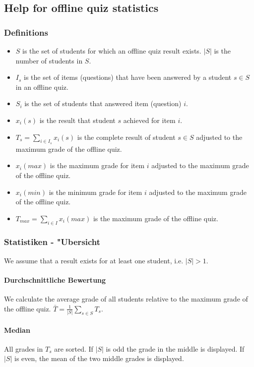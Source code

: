 \documentclass[12pt]{report}
\begin{document}
\subsection{Help for offline quiz statistics}
\subsubsection{Definitions}
\begin{itemize}
\item $S$ is the set of students for which an offline quiz result exists. $|S|$ is the number of students in $S$.
\item $I_s$ is the set of items (questions) that have been answered by a student $s\in S$ in an offline quiz.
\item $S_i$ is the set of students that answered item (question) $i$.
\item $x_i(s)$ is the result that student $s$ achieved for item $i$.
\item $T_s = \sum\limits_{i\in I_s} x_i(s)$ is the complete result of student $s\in S$ adjusted to the maximum grade of the offline quiz.
\item $x_i(max)$ is the maximum grade for item $i$ adjusted to the maximum grade of the offline quiz. 
\item $x_i(min)$ is the minimum grade for item $i$ adjusted to the maximum grade of the offline quiz. 
\item $T_{max}=\sum\limits_{i\in I} x_i(max)$ is the maximum grade of the offline quiz.
\end{itemize}

\subsubsection{Statistiken - "Ubersicht}
We assume that a result exists for at least one student, i.e. $|S|>1$.

\paragraph{Durchschnittliche Bewertung}
We calculate the average grade of all students relative to the maximum grade of the offline quiz.
$\bar{T}=\frac{1}{|S|}\sum\limits_{s\in S}T_s$.

\paragraph{Median}
All grades in $T_s$ are sorted. If $|S|$ is odd the grade in the middle is displayed. If $|S|$ is even, the mean of the two middle grades is displayed.
\end{document}
